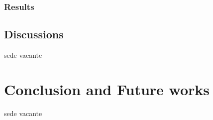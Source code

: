\documentclass[pdflatex,sn-mathphys]{sn-jnl}%
\theoremstyle{thmstyleone}%
\theoremstyle{thmstyletwo}%
\theoremstyle{thmstylethree}%
\begin{document}
\subsubsection{Results}

\subsection{Discussions}
sede vacante

\section{Conclusion and Future works}\label{conclusionandfutureworks}
sede vacante



\end{document}
